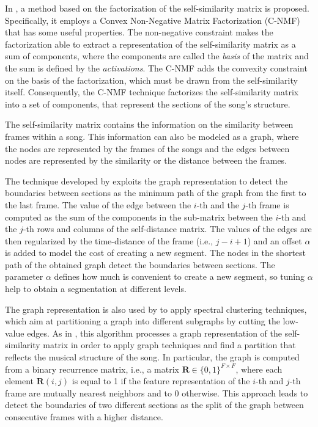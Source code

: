 In \cite{NietoCNMF}, a method based on the factorization of the self-similarity matrix  is proposed. Specifically, it employs a Convex Non-Negative Matrix Factorization (C-NMF) that has some useful properties. The non-negative constraint makes the factorization able to extract a representation of the self-similarity matrix as a sum of components, where the components are called the \textit{basis} of the matrix and the sum is defined by the \textit{activations}. The C-NMF adds the convexity constraint on the basis of the factorization, which must be drawn from the self-similarity itself. Consequently, the C-NMF technique factorizes the self-similarity matrix into a set of components, that represent the sections of the song's structure.

The self-similarity matrix contains the information on the similarity between frames within a song. This information can also be modeled as a graph, where the nodes are represented by the frames of the songs and the edges between nodes are represented by the similarity or the distance between the frames. 

The technique developed by \cite{jensen2005causal} exploits the graph representation to detect the boundaries between sections as the minimum path of the graph from the first to the last frame. The value of the edge between the $i$-th and the $j$-th frame is computed as the sum of the components in the sub-matrix between the $i$-th and the $j$-th rows and columns of the self-distance matrix. The values of the edges are then regularized by the time-distance of the frame (i.e., $j-i+1$) and an offset $\alpha$ is added to model the cost of creating a new segment. The nodes in the shortest path of the obtained graph detect the boundaries between sections. The parameter $\alpha$ defines how much is convenient to create a new segment, so tuning $\alpha$ help to obtain a segmentation at different levels.

The graph representation is also used by \cite{mcfee2014} to apply spectral clustering techniques, which aim at partitioning a graph into different subgraphs by cutting the low-value edges.
As in \cite{jensen2005causal}, this algorithm processes a graph representation of the self-similarity matrix in order to apply graph techniques and find a partition that reflects the musical structure of the song. In particular, the graph is computed from a binary recurrence matrix, i.e., a matrix $ \mathbf{R} \in \{0,1\}^{F \times F}$, where each element $ \mathbf{R}(i,j)$ is equal to 1 if the feature representation of the $i$-th and $j$-th frame are mutually nearest neighbors and to 0 otherwise. This approach leads to detect the boundaries of two different sections as the split of the graph between consecutive frames with a higher distance.

